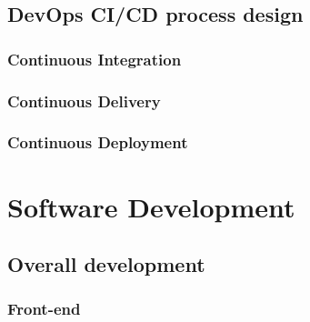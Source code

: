 \documentclass[]{article}
\begin{document}



\subsection{DevOps CI/CD process design}

\subsubsection{Continuous Integration}

\subsubsection{Continuous Delivery}

\subsubsection{Continuous Deployment}

\pagebreak

\section{Software Development} 

\subsection{Overall development}

\subsubsection{Front-end}

\end{document}
